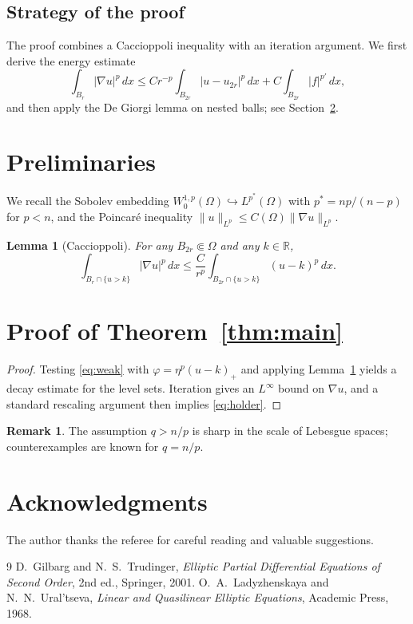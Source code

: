 \documentclass[11pt,reqno]{amsart}
\newtheorem{lemma}[theorem]{Lemma}
\theoremstyle{definition}
\newtheorem{remark}[theorem]{Remark}
\newcommand{\R}{\mathbb{R}}
\newcommand{\Om}{\Omega}
\begin{document}
\subsection{Strategy of the proof}
The proof combines a Caccioppoli inequality with an iteration argument.
We first derive the energy estimate
\begin{equation}
  \int_{B_r} |\nabla u|^p\,dx
  \le C r^{-p}\int_{B_{2r}} |u-u_{2r}|^p\,dx + C\int_{B_{2r}}|f|^{p'}\,dx ,
\end{equation}
and then apply the De Giorgi lemma on nested balls; see
Section~\ref{sec:proof}.

\section{Preliminaries}\label{sec:pre}

We recall the Sobolev embedding $W^{1,p}_0(\Om)\hookrightarrow L^{p^*}(\Om)$
with $p^*=np/(n-p)$ for $p<n$, and the Poincaré inequality
$\|u\|_{L^p}\le C(\Om)\|\nabla u\|_{L^p}$.

\begin{lemma}[Caccioppoli]\label{lem:cacc}
For any $B_{2r}\Subset\Om$ and any $k\in\R$,
\begin{equation}
  \int_{B_r\cap\{u>k\}}|\nabla u|^p\,dx
  \le \frac{C}{r^p}\int_{B_{2r}\cap\{u>k\}}(u-k)^p\,dx .
\end{equation}
\end{lemma}

\section{Proof of Theorem~\ref{thm:main}}\label{sec:proof}

\begin{proof}[Proof]
Testing \eqref{eq:weak} with $\varphi=\eta^p(u-k)_+$ and applying
Lemma~\ref{lem:cacc} yields a decay estimate for the level sets.
Iteration gives an $L^\infty$ bound on $\nabla u$, and a standard
rescaling argument then implies \eqref{eq:holder}.
\end{proof}

\begin{remark}
The assumption $q>n/p$ is sharp in the scale of Lebesgue spaces;
counterexamples are known for $q=n/p$.
\end{remark}

\section*{Acknowledgments}
The author thanks the referee for careful reading and valuable suggestions.

\begin{thebibliography}{9}
 D.~Gilbarg and N.~S.~Trudinger, \emph{Elliptic Partial Differential
  Equations of Second Order}, 2nd ed., Springer, 2001.
 O.~A.~Ladyzhenskaya and N.~N.~Ural'tseva, \emph{Linear and Quasilinear
  Elliptic Equations}, Academic Press, 1968.
\end{thebibliography}
\end{document}
